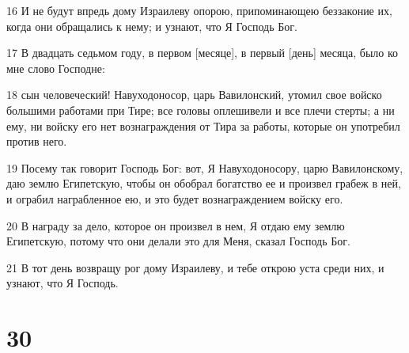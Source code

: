 \par 16 И не будут впредь дому Израилеву опорою, припоминающею беззаконие их, когда они обращались к нему; и узнают, что Я Господь Бог.
\par 17 В двадцать седьмом году, в первом [месяце], в первый [день] месяца, было ко мне слово Господне:
\par 18 сын человеческий! Навуходоносор, царь Вавилонский, утомил свое войско большими работами при Тире; все головы оплешивели и все плечи стерты; а ни ему, ни войску его нет вознаграждения от Тира за работы, которые он употребил против него.
\par 19 Посему так говорит Господь Бог: вот, Я Навуходоносору, царю Вавилонскому, даю землю Египетскую, чтобы он обобрал богатство ее и произвел грабеж в ней, и ограбил награбленное ею, и это будет вознаграждением войску его.
\par 20 В награду за дело, которое он произвел в нем, Я отдаю ему землю Египетскую, потому что они делали это для Меня, сказал Господь Бог.
\par 21 В тот день возвращу рог дому Израилеву, и тебе открою уста среди них, и узнают, что Я Господь.

\chapter{30}

